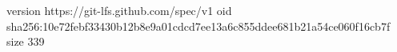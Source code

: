 version https://git-lfs.github.com/spec/v1
oid sha256:10e72febf33430b12b8e9a01cdcd7ee13a6c855ddee681b21a54ce060f16cb7f
size 339
